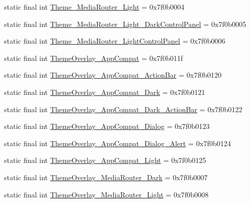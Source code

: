 \begin{CompactItemize}
\item 
static final int \hyperlink{classandroid_1_1support_1_1v7_1_1recyclerview_1_1_r_1_1style_ba736fbadb4e5fa8f5b12419e1cf1f3f}{Theme\_\-MediaRouter\_\-Light} = 0x7f0b0004
\item 
static final int \hyperlink{classandroid_1_1support_1_1v7_1_1recyclerview_1_1_r_1_1style_97abd1366ecbd959600054b315b1ff67}{Theme\_\-MediaRouter\_\-Light\_\-DarkControlPanel} = 0x7f0b0005
\item 
static final int \hyperlink{classandroid_1_1support_1_1v7_1_1recyclerview_1_1_r_1_1style_d9fa547651324482d9b31029b62f3460}{Theme\_\-MediaRouter\_\-LightControlPanel} = 0x7f0b0006
\item 
static final int \hyperlink{classandroid_1_1support_1_1v7_1_1recyclerview_1_1_r_1_1style_70a81aee9e9b4e3ed5d877ac86f7ffc7}{ThemeOverlay\_\-AppCompat} = 0x7f0b011f
\item 
static final int \hyperlink{classandroid_1_1support_1_1v7_1_1recyclerview_1_1_r_1_1style_708c8099b3cac0743d8da8dae15bf819}{ThemeOverlay\_\-AppCompat\_\-ActionBar} = 0x7f0b0120
\item 
static final int \hyperlink{classandroid_1_1support_1_1v7_1_1recyclerview_1_1_r_1_1style_d72b781fcf6049c47acb14ba70b92321}{ThemeOverlay\_\-AppCompat\_\-Dark} = 0x7f0b0121
\item 
static final int \hyperlink{classandroid_1_1support_1_1v7_1_1recyclerview_1_1_r_1_1style_3cd6deedd133e69ab95b67e31d282912}{ThemeOverlay\_\-AppCompat\_\-Dark\_\-ActionBar} = 0x7f0b0122
\item 
static final int \hyperlink{classandroid_1_1support_1_1v7_1_1recyclerview_1_1_r_1_1style_d0bf7979064fb5b8a8e714d28ac9bb9d}{ThemeOverlay\_\-AppCompat\_\-Dialog} = 0x7f0b0123
\item 
static final int \hyperlink{classandroid_1_1support_1_1v7_1_1recyclerview_1_1_r_1_1style_e662b1ed5e3ac0656e0616e582c5afce}{ThemeOverlay\_\-AppCompat\_\-Dialog\_\-Alert} = 0x7f0b0124
\item 
static final int \hyperlink{classandroid_1_1support_1_1v7_1_1recyclerview_1_1_r_1_1style_379edfba535ec7151c8fadfd950a45be}{ThemeOverlay\_\-AppCompat\_\-Light} = 0x7f0b0125
\item 
static final int \hyperlink{classandroid_1_1support_1_1v7_1_1recyclerview_1_1_r_1_1style_b5d952f731f77093e8f53602fa41440e}{ThemeOverlay\_\-MediaRouter\_\-Dark} = 0x7f0b0007
\item 
static final int \hyperlink{classandroid_1_1support_1_1v7_1_1recyclerview_1_1_r_1_1style_8c3e6162c5249330a4cbacbf3152c221}{ThemeOverlay\_\-MediaRouter\_\-Light} = 0x7f0b0008

\end{CompactItemize}
